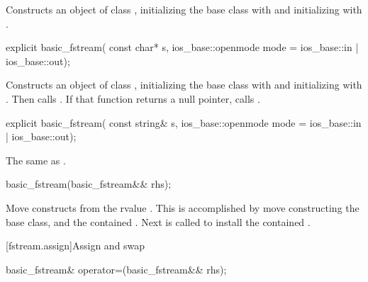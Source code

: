 \begin{itemdescr}
\pnum
\effects
Constructs an object of class
,
initializing the base class with
and initializing
with
.
\end{itemdescr}

%
\begin{itemdecl}
explicit basic_fstream(
  const char* s,
  ios_base::openmode mode = ios_base::in | ios_base::out);
\end{itemdecl}

\begin{itemdescr}
\pnum
\effects
Constructs an object of class
,
initializing the base class with
and initializing
with
.
Then calls
.
If that function returns a null pointer, calls
.
\end{itemdescr}

%
\begin{itemdecl}
explicit basic_fstream(
  const string& s,
  ios_base::openmode mode = ios_base::in | ios_base::out);
\end{itemdecl}

\begin{itemdescr}
\pnum
\effects The same as .
\end{itemdescr}

%
\begin{itemdecl}
basic_fstream(basic_fstream&& rhs);
\end{itemdecl}

\begin{itemdescr}
\pnum
\effects Move constructs from the rvalue . This
is accomplished by move constructing the base class, and the contained
. Next
 is called to install
the contained .
\end{itemdescr}

[fstream.assign]{Assign and swap}

%
\begin{itemdecl}
basic_fstream& operator=(basic_fstream&& rhs);
\end{itemdecl}

